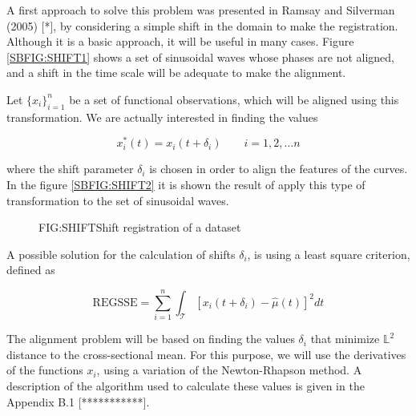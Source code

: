 A first approach to solve this problem was presented in Ramsay and Silverman
(2005) [*], by considering a simple shift in the domain to make the
registration. Although it is a basic approach, it will be useful in many cases.
Figure \ref{SBFIG:SHIFT1} shows a set of sinusoidal waves whose phases are not
aligned, and a shift in the time scale will be adequate to make the alignment.

Let $\{x_i\}_{i=1}^n$ be a set of functional observations, which will be aligned
using this transformation. We are actually interested in finding the values

$$
x_i^*(t)=x_i(t+ \delta_i) \qquad i=1,2, \dots n
$$

where the shift parameter $\delta_i$ is chosen in order to align the features of
the curves. In the figure \ref{SBFIG:SHIFT2} it is shown the result of apply
this type of transformation to the set of sinusoidal waves.

\begin{figure}[Shift registration of a dataset]{FIG:SHIFT}{Shift registration of a dataset}
   \quad
\end{figure}

A possible solution for the calculation of shifts $\delta_i$, is using a least
square criterion, defined as

$$
\text{REGSSE} = \sum_{i=1}^{n}\int_{\mathcal{T}}\left [x_i(t+\delta_i) - \hat \mu(t) \right ]^2 dt
$$

The alignment problem will be based on finding the values $\delta_i$ that
minimize $\mathbb{L}^2$ distance to the cross-sectional mean. For this purpose,
we will use the derivatives of the functions $x_i$, using a variation of the
Newton-Rhapson method. A description of the algorithm used to calculate these
values is given in the Appendix B.1 [***********].
